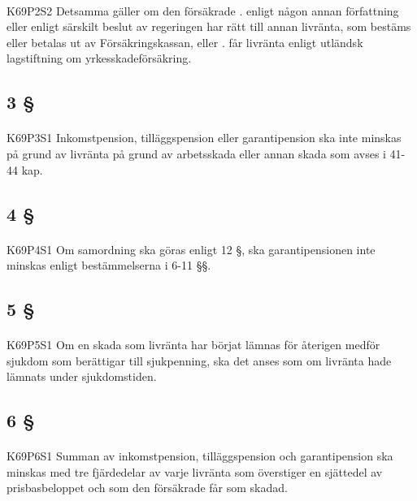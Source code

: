 \documentclass[a4paper,notitlepage,openany,10pt]{book}
\begin{document}
\paragraph*{}
{\tiny K69P2S2}
Detsamma gäller om den försäkrade
. enligt någon annan författning eller enligt särskilt beslut av regeringen har rätt till annan livränta, som bestäms eller betalas ut av Försäkringskassan, eller
. får livränta enligt utländsk lagstiftning om yrkesskadeförsäkring.
\subsection*{3 §}
\paragraph*{}
{\tiny K69P3S1}
Inkomstpension, tilläggspension eller garantipension ska inte minskas på grund av livränta på grund av arbetsskada eller annan skada som avses i 41-44 kap.
\subsection*{4 §}
\paragraph*{}
{\tiny K69P4S1}
Om samordning ska göras enligt 12 §, ska garantipensionen inte minskas enligt bestämmelserna i 6-11 §§.
\subsection*{5 §}
\paragraph*{}
{\tiny K69P5S1}
Om en skada som livränta har börjat lämnas för återigen medför sjukdom som berättigar till sjukpenning, ska det anses som om livränta hade lämnats under sjukdomstiden.
\subsection*{6 §}
\paragraph*{}
{\tiny K69P6S1}
Summan av inkomstpension, tilläggspension och garantipension ska minskas med tre fjärdedelar av varje livränta som överstiger en sjättedel av prisbasbeloppet och som den försäkrade får som skadad.
\end{document}
